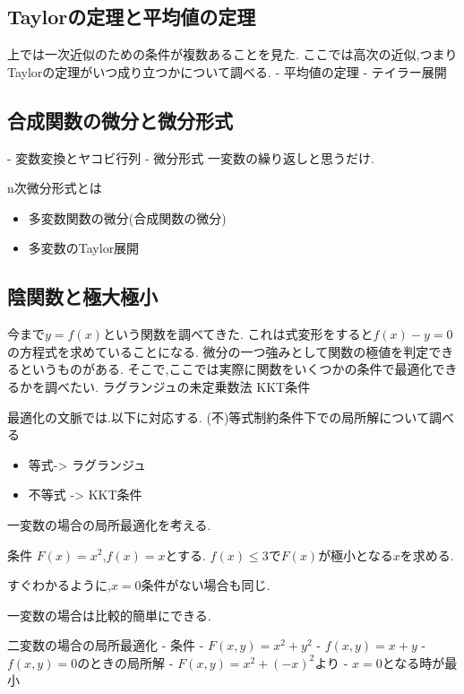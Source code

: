 \documentclass{ujarticle}
\begin{document}
\subsection{Taylorの定理と平均値の定理}
上では一次近似のための条件が複数あることを見た.
ここでは高次の近似,つまりTaylorの定理がいつ成り立つかについて調べる.
- 平均値の定理
- テイラー展開


\subsection{合成関数の微分と微分形式}

- 変数変換とヤコビ行列
- 微分形式
  一変数の繰り返しと思うだけ.

n次微分形式とは


\begin{exs}
  \begin{itemize}
    \item 多変数関数の微分(合成関数の微分)
    \item 多変数のTaylor展開
  \end{itemize}
\end{exs}


\subsection{陰関数と極大極小}
今まで$y=f(x)$という関数を調べてきた.
これは式変形をすると$f(x)-y =0$の方程式を求めていることになる.
微分の一つ強みとして関数の極値を判定できるというものがある.
そこで,ここでは実際に関数をいくつかの条件で最適化できるかを調べたい.
ラグランジュの未定乗数法
KKT条件

\begin{rem}
 最適化の文脈では.以下に対応する.
 (不)等式制約条件下での局所解について調べる
\begin{itemize}
  \item 等式-> ラグランジュ
  \item 不等式 -> KKT条件
\end{itemize}
\end{rem}

一変数の場合の局所最適化を考える.
\begin{epl}
条件
$F(x) = x^2$,$f(x) = x$とする.
$f(x) \le 3$で$F(x)$が極小となる$x$を求める.

すぐわかるように,$x = 0$条件がない場合も同じ.
\end{epl}
一変数の場合は比較的簡単にできる.

二変数の場合の局所最適化
- 条件
  - $F(x, y) = x^2 + y^2$
  - $f(x, y) = x + y$
- $f(x ,y) = 0$のときの局所解
  - $F(x , y) = x^2 + (-x)^2$より
  - $x = 0$となる時が最小
\end{document}
